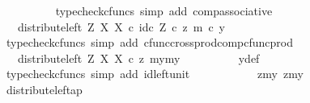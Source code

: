 \begin{isabellebody}
\ \ \ \ \ \ \ \ \isamarkupfalse%
\ {\isacharparenleft}{\kern0pt}typecheck{\isacharunderscore}{\kern0pt}cfuncs{\isacharcomma}{\kern0pt}\ simp\ add{\isacharcolon}{\kern0pt}\ comp{\isacharunderscore}{\kern0pt}associative{}{\isacharparenright}{\kern0pt}\isanewline
\ \ \ \ \ \ \isamarkupfalse%
\ \isamarkupfalse%
\ {\isachardoublequoteopen}{\isachardot}{\kern0pt}{\isachardot}{\kern0pt}{\isachardot}{\kern0pt}\ {\isacharequal}{\kern0pt}\ distribute{\isacharunderscore}{\kern0pt}left\ Z\ X\ X\ {\isasymcirc}\isactrlsub c\ {\isasymlangle}id\isactrlsub c\ Z\ {\isasymcirc}\isactrlsub c\ z{\isacharcomma}{\kern0pt}\ m\ {\isasymcirc}\isactrlsub c\ y{\isacharprime}{\kern0pt}{\isasymrangle}{\isachardoublequoteclose}\isanewline
\ \ \ \ \ \ \ \ \isamarkupfalse%
\ {\isacharparenleft}{\kern0pt}typecheck{\isacharunderscore}{\kern0pt}cfuncs{\isacharcomma}{\kern0pt}\ simp\ add{\isacharcolon}{\kern0pt}\ cfunc{\isacharunderscore}{\kern0pt}cross{\isacharunderscore}{\kern0pt}prod{\isacharunderscore}{\kern0pt}comp{\isacharunderscore}{\kern0pt}cfunc{\isacharunderscore}{\kern0pt}prod{\isacharparenright}{\kern0pt}\isanewline
\ \ \ \ \ \ \isamarkupfalse%
\ \isamarkupfalse%
\ {\isachardoublequoteopen}{\isachardot}{\kern0pt}{\isachardot}{\kern0pt}{\isachardot}{\kern0pt}\ {\isacharequal}{\kern0pt}\ distribute{\isacharunderscore}{\kern0pt}left\ Z\ X\ X\ {\isasymcirc}\isactrlsub c\ {\isasymlangle}z{\isacharcomma}{\kern0pt}\ {\isasymlangle}my{}{\isacharcomma}{\kern0pt}my{}{\isasymrangle}{\isasymrangle}{\isachardoublequoteclose}\isanewline
\ \ \ \ \ \ \ \ \isamarkupfalse%
\ y{\isacharprime}{\kern0pt}{\isacharunderscore}{\kern0pt}def\ \isamarkupfalse%
\ {\isacharparenleft}{\kern0pt}typecheck{\isacharunderscore}{\kern0pt}cfuncs{\isacharcomma}{\kern0pt}\ simp\ add{\isacharcolon}{\kern0pt}\ id{\isacharunderscore}{\kern0pt}left{\isacharunderscore}{\kern0pt}unit{}{\isacharparenright}{\kern0pt}\isanewline
\ \ \ \ \ \ \isamarkupfalse%
\ \isamarkupfalse%
\ {\isachardoublequoteopen}{\isachardot}{\kern0pt}{\isachardot}{\kern0pt}{\isachardot}{\kern0pt}\ {\isacharequal}{\kern0pt}\ {\isasymlangle}{\isasymlangle}z{\isacharcomma}{\kern0pt}my{}{\isasymrangle}{\isacharcomma}{\kern0pt}\ {\isasymlangle}z{\isacharcomma}{\kern0pt}my{}{\isasymrangle}{\isasymrangle}{\isachardoublequoteclose}\isanewline
\ \ \ \ \ \ \ \ \isamarkupfalse%
\ distribute{\isacharunderscore}{\kern0pt}left{\isacharunderscore}{\kern0pt}ap\ \isamarkupfalse%

\end{isabellebody}
